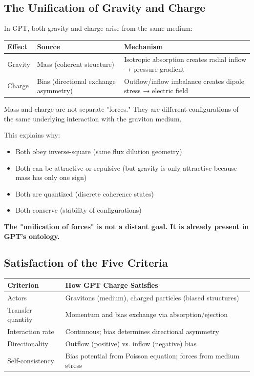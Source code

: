 \documentclass[12pt, a4paper]{article}
\begin{document}
\subsection{The Unification of Gravity and Charge}
\label{subsec:unification_gravity_charge}

In GPT, both gravity and charge arise from the same medium:

\begin{center}
\begin{tabular}{|p{3cm}|p{4cm}|p{7cm}|}
\hline
\textbf{Effect} & \textbf{Source} & \textbf{Mechanism} \\
\hline
Gravity & Mass (coherent structure) & Isotropic absorption creates radial inflow → pressure gradient \\
\hline
Charge & Bias (directional exchange asymmetry) & Outflow/inflow imbalance creates dipole stress → electric field \\
\hline
\end{tabular}
\end{center}

Mass and charge are not separate "forces." They are different configurations of the same underlying interaction with the graviton medium.

This explains why:
\begin{itemize}
    \item Both obey inverse-square (same flux dilution geometry)
    \item Both can be attractive or repulsive (but gravity is only attractive because mass has only one sign)
    \item Both are quantized (discrete coherence states)
    \item Both conserve (stability of configurations)
\end{itemize}

\textbf{The "unification of forces" is not a distant goal. It is already present in GPT's ontology.}

\subsection{Satisfaction of the Five Criteria}
\label{subsec:charge_criteria}

\begin{center}
\begin{tabular}{|p{3.5cm}|p{10cm}|}
\hline
\textbf{Criterion} & \textbf{How GPT Charge Satisfies} \\
\hline
Actors & Gravitons (medium), charged particles (biased structures) \\
\hline
Transfer quantity & Momentum and bias exchange via absorption/ejection \\
\hline
Interaction rate & Continuous; bias determines directional asymmetry \\
\hline
Directionality & Outflow (positive) vs. inflow (negative) bias \\
\hline
Self-consistency & Bias potential from Poisson equation; forces from medium stress \\
\hline
\end{tabular}
\end{center}
\end{document}
